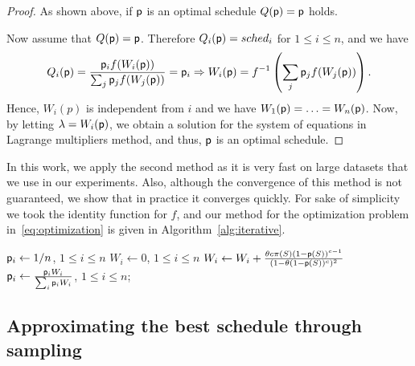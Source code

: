 \begin{proof}
	As shown above, if $\sched$ is an optimal schedule $Q(\mathsf{p})=\mathsf{p}$ holds.

	Now assume that $Q(\mathsf{p})=\mathsf{p}$. Therefore $Q_i(\mathsf{p}) = sched_i$ for
	$1\leq i \leq n$, and we have
	\begin{align*}
	Q_i(\mathsf{p}) = \frac{\mathsf{p}_i f(W_i(\mathsf{p}))}{\sum_{j} \mathsf{p}_j
f(W_j(\mathsf{p}))} = \mathsf{p}_i
	\Rightarrow
	W_i(\mathsf{p}) = f^{-1}\left(\sum_{j} \mathsf{p}_j f(W_j(\mathsf{p}))\right).
	\end{align*}
	Hence, $W_i(p)$ is independent from $i$ and we have
	$W_1(\mathsf{p})=\ldots=W_n(\mathsf{p})$. Now, by letting $\lambda = W_i(\mathsf{p})$,
	we obtain a solution for the system of equations in Lagrange multipliers
	method, and thus, $\sched$ is an optimal schedule.
\end{proof}

In this work, we apply the second method as it is very fast on large datasets
that we use in our experiments. Also, although the convergence of this method is
not guaranteed, we show that in practice it converges quickly. For sake of
simplicity we took the identity function for $f$, and our method for the
optimization problem in~\eqref{eq:optimization} is given in
Algorithm~\ref{alg:iterative}.

\begin{algorithm}[ht]
	\DontPrintSemicolon
	$\mathsf{p}_i \leftarrow 1/n$, $1\le i\le n$\;
	 {
		$W_i\leftarrow 0$, $1\le i\le n$\;
		 {
			 {
				$W_i \leftarrow W_i + \frac{\theta c \pi(S) (1-\mathsf{p}(S))^{c-1}}{(1-\theta(1-\mathsf{p}(S))^c)^2}$\;
			}
		}
		$\mathsf{p}_i\leftarrow \frac{\mathsf{p}_iW_i}{\sum_{i} \mathsf{p}_iW_i}$, $1\le i\le n$;
	}
	\Return{$\sched$}\;
	\caption{\algoname}
	\label{alg:iterative}
\end{algorithm}


\subsection{Approximating the best schedule through sampling}\label{sec:sampcomp}

